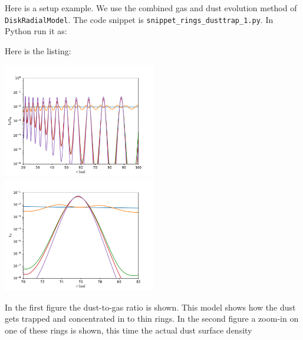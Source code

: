 \documentclass{book}
\newcommand{\code}[1]{{\small\tt #1}}
\begin{document}
Here is a setup example. We use the combined gas and dust evolution method
of \code{DiskRadialModel}. The code snippet is
\code{snippet\_rings\_dusttrap\_1.py}. In Python run it as:
\begin{codebox}
\end{codebox}
Here is the listing:

\centerline{\includegraphics[width=0.5\textwidth]{../snippets/fig_snippet_rings_dusttrap_1_1.pdf}
\includegraphics[width=0.5\textwidth]{../snippets/fig_snippet_rings_dusttrap_1_2.pdf}}
In the first figure the dust-to-gas ratio is shown. This model shows how the
dust gets trapped and concentrated in to thin rings. In the second figure a
zoom-in on one of these rings is shown, this time the actual dust surface
density


\pagebreak
\end{document}
